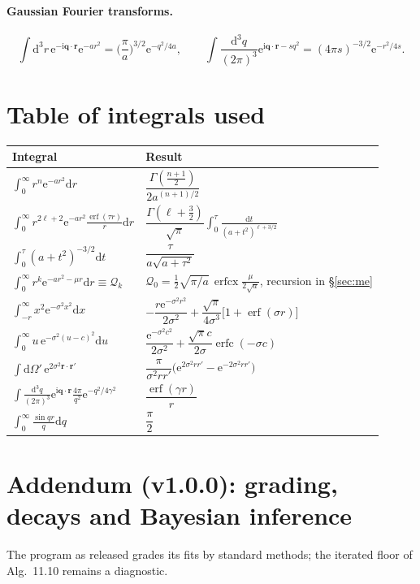\documentclass[11pt,a4paper]{article}
\numberwithin{equation}{section}
\theoremstyle{definition}
\theoremstyle{plain}
\theoremstyle{remark}
\numberwithin{algorithm}{section}
\newcommand{\vr}{\bm r}
\newcommand{\vq}{\bm q}
\newcommand{\dd}{\mathrm{d}}
\newcommand{\ii}{\mathrm{i}}
\newcommand{\ee}{\mathrm{e}}
\newcommand{\erf}{\operatorname{erf}}
\newcommand{\erfc}{\operatorname{erfc}}
\newcommand{\erfcx}{\operatorname{erfcx}}
\begin{document}
\paragraph{Gaussian Fourier transforms.}
\[
\int\dd^3r\,\ee^{-\ii\vq\cdot\vr}\ee^{-ar^2}=\Big(\frac\pi a\Big)^{3/2}\ee^{-q^2/4a},\qquad \int\frac{\dd^3q}{(2\pi)^3}\ee^{\ii\vq\cdot\vr-sq^2}=(4\pi s)^{-3/2}\ee^{-r^2/4s}.
\]

\section{Table of integrals used}\label{app:integrals}
\begin{center}\small
\renewcommand{\arraystretch}{2.6}
\begin{tabular}{@{}ll@{}}
\toprule
Integral & Result\\\midrule
$\int_0^\infty r^{n}\ee^{-ar^2}\dd r$ & $\dfrac{\Gamma(\frac{n+1}2)}{2a^{(n+1)/2}}$\\
$\int_0^\infty r^{2\ell+2}\ee^{-ar^2}\frac{\erf(\tau r)}{r}\dd r$ & $\dfrac{\Gamma(\ell+\frac32)}{\sqrt\pi}\displaystyle\int_0^\tau\frac{\dd t}{(a+t^2)^{\ell+3/2}}$\\
$\int_0^\tau(a+t^2)^{-3/2}\dd t$ & $\dfrac{\tau}{a\sqrt{a+\tau^2}}$\\
$\int_0^\infty r^k\ee^{-ar^2-\mu r}\dd r\equiv\mathcal Q_k$ & $\mathcal Q_0=\frac12\sqrt{\pi/a}\,\erfcx\frac{\mu}{2\sqrt a}$, recursion in \S\ref{sec:me}\\
$\int_{-r}^{\infty}x^2\ee^{-\sigma^2x^2}\dd x$ & $-\dfrac{r\ee^{-\sigma^2r^2}}{2\sigma^2}+\dfrac{\sqrt\pi}{4\sigma^3}\big[1+\erf(\sigma r)\big]$\\
$\int_0^\infty u\,\ee^{-\sigma^2(u-c)^2}\dd u$ & $\dfrac{\ee^{-\sigma^2c^2}}{2\sigma^2}+\dfrac{\sqrt\pi c}{2\sigma}\erfc(-\sigma c)$\\
$\int\dd\Omega'\,\ee^{2\sigma^2\vr\cdot\vr'}$ & $\dfrac{\pi}{\sigma^2rr'}\big(\ee^{2\sigma^2rr'}-\ee^{-2\sigma^2rr'}\big)$\\
$\int\frac{\dd^3q}{(2\pi)^3}\ee^{\ii\vq\cdot\vr}\frac{4\pi}{q^2}\ee^{-q^2/4\gamma^2}$ & $\dfrac{\erf(\gamma r)}{r}$\\
$\int_0^\infty\frac{\sin qr}{q}\dd q$ & $\dfrac\pi2$\\\bottomrule
\end{tabular}
\end{center}

\section{Addendum (v1.0.0): grading, decays and Bayesian inference}\label{app:v1}
The program as released grades its fits by standard methods; the iterated floor of
Alg.~11.10 remains a diagnostic.
\end{document}
